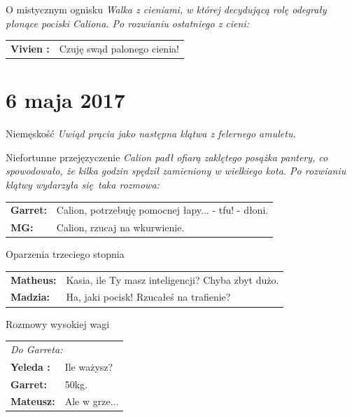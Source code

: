 \documentclass[10pt,twoside,twocolumn]{book}
\begin{document}
\begin{rpg-quotebox}{O mistycznym ognisku}
   \textit{Walka z cieniami, w której decydującą rolę odegrały płonące pociski Caliona. Po rozwianiu ostatniego z cieni:}\\
   
   \begin{tabularx}{\columnwidth}{lX}
      \textbf{Vivien :} & Czuję swąd palonego cienia!\\
   \end{tabularx}
\end{rpg-quotebox}


\section*{6 maja 2017}


\begin{rpg-quotebox}{Niemęskość}
   \textit{Uwiąd prącia jako następna klątwa z felernego amuletu.}
\end{rpg-quotebox}


\begin{rpg-quotebox}{Niefortunne przejęzyczenie}
   \textit{Calion padł ofiarą zaklętego posążka pantery, co spowodowało, że kilka godzin spędził zamieniony w wielkiego kota. Po rozwianiu klątwy wydarzyła się taka rozmowa:}\\
   
   \begin{tabularx}{\columnwidth}{lX}
      \textbf{Garret:} & Calion, potrzebuję pomocnej łapy... - tfu! - dłoni. \\
      \textbf{MG:} & Calion, rzucaj na wkurwienie. \\
   \end{tabularx}
\end{rpg-quotebox}


\begin{rpg-quotebox}{Oparzenia trzeciego stopnia}
   \begin{tabularx}{\columnwidth}{lX}
      \textbf{Matheus:} & Kasia, ile Ty masz inteligencji? Chyba zbyt dużo.\\
      \textbf{Madzia:} & Ha, jaki pocisk! Rzucałeś na trafienie?\\
   \end{tabularx}
\end{rpg-quotebox}


\begin{rpg-quotebox}{Rozmowy wysokiej wagi}
   \begin{tabularx}{\columnwidth}{lX}
      \multicolumn{2}{l}{\textit{Do Garreta:}}\\
      \textbf{Yeleda :} & Ile ważysz? \\
      \textbf{Garret:} & 50kg.\\
      \textbf{Mateusz:} & Ale w grze...\\
   \end{tabularx}
\end{rpg-quotebox}
\end{document}
